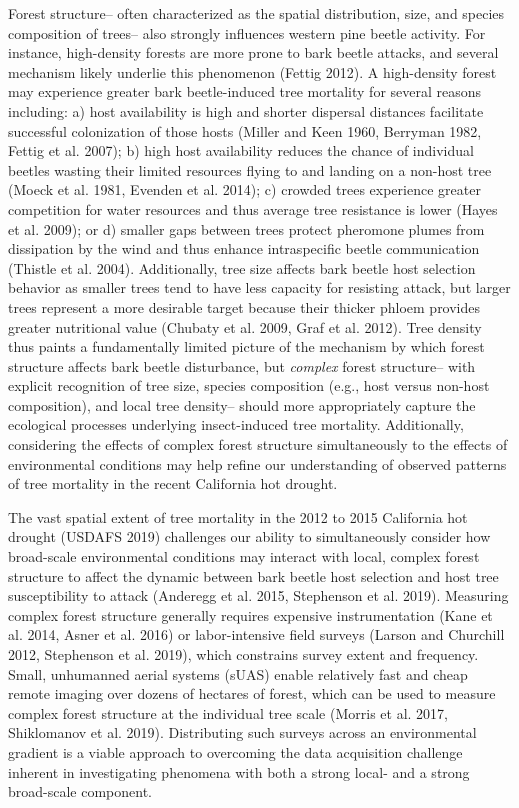 \documentclass[]{article}
\begin{document}
Forest structure-- often characterized as the spatial distribution,
size, and species composition of trees-- also strongly influences
western pine beetle activity. For instance, high-density forests are
more prone to bark beetle attacks, and several mechanism likely underlie
this phenomenon (Fettig 2012). A high-density forest may experience
greater bark beetle-induced tree mortality for several reasons
including: a) host availability is high and shorter dispersal distances
facilitate successful colonization of those hosts (Miller and Keen 1960,
Berryman 1982, Fettig et al. 2007); b) high host availability reduces
the chance of individual beetles wasting their limited resources flying
to and landing on a non-host tree (Moeck et al. 1981, Evenden et al.
2014); c) crowded trees experience greater competition for water
resources and thus average tree resistance is lower (Hayes et al. 2009);
or d) smaller gaps between trees protect pheromone plumes from
dissipation by the wind and thus enhance intraspecific beetle
communication (Thistle et al. 2004). Additionally, tree size affects
bark beetle host selection behavior as smaller trees tend to have less
capacity for resisting attack, but larger trees represent a more
desirable target because their thicker phloem provides greater
nutritional value (Chubaty et al. 2009, Graf et al. 2012). Tree density
thus paints a fundamentally limited picture of the mechanism by which
forest structure affects bark beetle disturbance, but \emph{complex}
forest structure-- with explicit recognition of tree size, species
composition (e.g., host versus non-host composition), and local tree
density-- should more appropriately capture the ecological processes
underlying insect-induced tree mortality. Additionally, considering the
effects of complex forest structure simultaneously to the effects of
environmental conditions may help refine our understanding of observed
patterns of tree mortality in the recent California hot drought.

The vast spatial extent of tree mortality in the 2012 to 2015 California
hot drought (USDAFS 2019) challenges our ability to simultaneously
consider how broad-scale environmental conditions may interact with
local, complex forest structure to affect the dynamic between bark
beetle host selection and host tree susceptibility to attack (Anderegg
et al. 2015, Stephenson et al. 2019). Measuring complex forest structure
generally requires expensive instrumentation (Kane et al. 2014, Asner et
al. 2016) or labor-intensive field surveys (Larson and Churchill 2012,
Stephenson et al. 2019), which constrains survey extent and frequency.
Small, unhumanned aerial systems (sUAS) enable relatively fast and cheap
remote imaging over dozens of hectares of forest, which can be used to
measure complex forest structure at the individual tree scale (Morris et
al. 2017, Shiklomanov et al. 2019). Distributing such surveys across an
environmental gradient is a viable approach to overcoming the data
acquisition challenge inherent in investigating phenomena with both a
strong local- and a strong broad-scale component.
\end{document}
